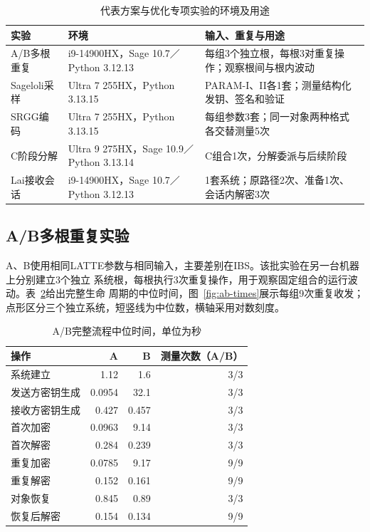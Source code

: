 \begin{table}[H]
\centering\small
\caption{代表方案与优化专项实验的环境及用途}
\label{tab:specialized-environments}
\begin{tabularx}{\textwidth}{@{}>{\raggedright\arraybackslash}p{}>{\raggedright\arraybackslash}p{}>{\raggedright\arraybackslash}X@{}}
\toprule
\rowcolor{black!8} 实验 & 环境 & 输入、重复与用途 \\
\midrule
A/B多根重复 & i9-14900HX，Sage 10.7／Python 3.12.13 & 每组3个独立根，每根3对重复操作；观察根间与根内波动 \\
Sageloli采样 & Ultra 7 255HX，Python 3.13.15 & PARAM-I、II各1套；测量结构化发钥、签名和验证 \\
SRGG编码 & Ultra 7 255HX，Python 3.13.15 & 每组参数3套；同一对象两种格式各交替测量5次 \\
C阶段分解 & Ultra 9 275HX，Sage 10.9／Python 3.13.14 & C组合1次，分解委派与后续阶段 \\
Lai接收会话 & i9-14900HX，Sage 10.7／Python 3.12.13 & 1套系统；原路径2次、准备1次、会话内解密3次 \\
\bottomrule
\end{tabularx}
\end{table}

\subsection{A/B多根重复实验}
A、B使用相同LATTE参数与相同输入，主要差别在IBS。该批实验在另一台机器上分别建立3个独立
系统根，每根执行3次重复操作，用于观察固定组合的运行波动。表~\ref{tab:ab-times}给出完整生命
周期的中位时间，图~\ref{fig:ab-times}展示每组9次重复收发；点形区分三个独立系统，短竖线为中位数，横轴采用对数刻度。

\begin{table}[H]
\centering\small
\caption{A/B完整流程中位时间，单位为秒}
\label{tab:ab-times}
\begin{tabular}{@{}lrrr@{}}
\toprule
\rowcolor{black!8} 操作 & A & B & 测量次数（A/B） \\
\midrule
系统建立 & 1.12 & 1.6 & 3/3 \\
发送方密钥生成 & 0.0954 & 32.1 & 3/3 \\
接收方密钥生成 & 0.427 & 0.457 & 3/3 \\
首次加密 & 0.0963 & 9.14 & 3/3 \\
首次解密 & 0.284 & 0.239 & 3/3 \\
重复加密 & 0.0785 & 9.17 & 9/9 \\
重复解密 & 0.152 & 0.161 & 9/9 \\
对象恢复 & 0.845 & 0.89 & 3/3 \\
恢复后解密 & 0.154 & 0.134 & 9/9 \\
\bottomrule
\end{tabular}
\end{table}

